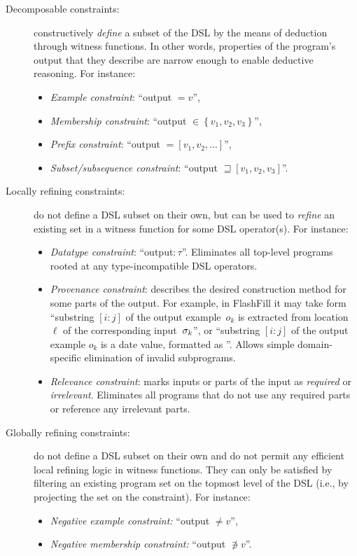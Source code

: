 \begin{description}
    \item[Decomposable constraints:] constructively \emph{define} a subset of the DSL by the means of
        deduction through witness functions.
        In other words, properties of the program's output that they describe are narrow enough to enable deductive
        reasoning.
        For instance:
        \begin{itemize}[nosep]
            \item \emph{Example constraint}: ``output $= v$'',
            \item \emph{Membership constraint}: ``output $\in \left\{v_1, v_2, v_3\right\}$'',
            \item \emph{Prefix constraint}: ``output $= [v_1, v_2, \dots]$'',
            \item \emph{Subset/subsequence constraint}: ``output $\sqsupseteq [v_1, v_2, v_3]$''.
        \end{itemize}
    \item[Locally refining constraints:] do not define a DSL subset on their own, but can be used to
        \emph{refine} an existing set in a witness function for some DSL operator(s).
        For instance:
        \begin{itemize}[nosep]
            \item \emph{Datatype constraint}: ``output$\colon \tau$''.
                Eliminates all top-level programs rooted at any type-incompatible DSL operators.
            \item \emph{Provenance constraint}: describes the desired construction method for some parts of the output.
                For example, in FlashFill it may take form ``substring $[i:j]$ of the output example~$o_k$ is extracted from
                location $\ell$ of
                the corresponding input~$\sigma_k$'', or ``substring $[i:j]$ of the output example $o_k$ is a date
                value, formatted as
                ''.
                Allows simple domain-specific elimination of invalid subprograms.
            \item \emph{Relevance constraint}: marks inputs or parts of the input as \emph{required} or
                \emph{irrelevant}.
                Eliminates all programs that do not use any required parts or reference any irrelevant parts.
        \end{itemize}
    \item[Globally refining constraints:] do not define a DSL subset on their own and do not permit any
        efficient local refining logic in witness functions.
        They can only be satisfied by filtering an existing program set on the topmost level of the DSL (i.e., by
        projecting the set on the constraint).
        For instance:
        \begin{itemize}[nosep]
            \item \emph{Negative example constraint:} ``output $\ne v$'',
            \item \emph{Negative membership constraint:} ``output $\not\ni v$''.
        \end{itemize}
\end{description}
